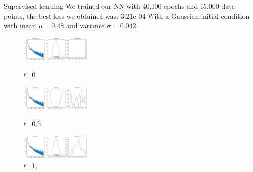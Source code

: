 \begin{frame}{Supervised learning}
    We trained our NN with 40.000 epochs and 15.000 data points, the best loss we obtained was: 3.21e-04 With a Gaussian initial condition with mean $\mu= 0.48$ and variance $\sigma= 0.042$
    \begin{figure}
        \centering
        \includegraphics[width=0.3\textwidth]{images/data1.png}
        \caption{t=0}
        \includegraphics[width=0.3\textwidth]{images/data3.png}
        \caption{t=0.5}
        \includegraphics[width=0.3\textwidth]{images/data5.png}
        \caption{t=1.}
    \end{figure}
\end{frame}